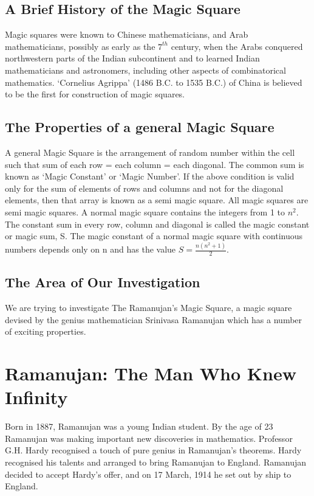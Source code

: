 \documentclass[a4paper,12pt,oneside]{book}
\begin{document}
\subsection{A Brief History of the Magic Square}
Magic squares were known to Chinese mathematicians, and Arab mathematicians, possibly as early as the $7^{th}$ century, when the Arabs conquered northwestern parts of the Indian subcontinent and to learned Indian mathematicians and astronomers, including other aspects of combinatorical mathematics. ‘Cornelius Agrippa’ (1486 B.C. to 1535 B.C.) of China is believed to be the first for construction of magic squares.

\subsection{The Properties of a general Magic Square}
A general Magic Square is the arrangement of random number within the cell such that sum of each row = each column = each diagonal. The common sum is known as ‘Magic Constant’ or ‘Magic Number’. If the above condition is valid only for the sum of elements of rows and columns and not for the diagonal elements, then that array is known as a semi magic square. All magic squares are semi magic squares. A normal magic square contains the integers from 1 to $n^2$. The constant sum in every row, column and diagonal is called the magic constant or magic sum, S. The magic constant of a normal magic square with continuous numbers depends only on n and has the value $S = \frac{n(n^2+1)}{2}$.

\subsection{The Area of Our Investigation}
We are trying to investigate The Ramanujan's Magic Square, a magic square devised by the genius mathematician Srinivasa Ramanujan which has a number of exciting properties.

\newpage
\section{Ramanujan: The Man Who Knew Infinity}
\tab Born in 1887, Ramanujan was a young Indian student.
By the age of 23 Ramanujan was making important new discoveries in mathematics. Professor G.H. Hardy recognised a touch of pure genius in Ramanujan’s theorems. Hardy recognised his talents and arranged to bring Ramanujan to England. Ramanujan decided to accept Hardy’s offer, and on 17 March, 1914 he set out by ship to England.
\end{document}
